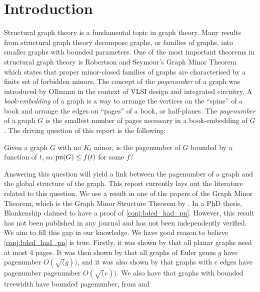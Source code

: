 \chapter{Introduction}\label{sec:introduction}
Structural graph theory is a fundamental topic in graph theory. Many results from structural graph theory decompose graphs, or families of graphs, into smaller graphs with bounded parameters. One of the most important theorems in structural graph theory is Robertson and Seymour's Graph Minor Theorem \cite{robertsonGraphMinorsXX2004} which states that proper minor-closed families of graphs are characterised by a finite set of forbidden minors.
The concept of the \textit{pagenumber} of a graph was introduced by Ollmann \cite{ollmannBookThicknessVarious1973} in the context of VLSI design and integrated circuitry. A \textit{book-embedding} of a graph is a way to arrange the vertices on the ``spine'' of a book and arrange the edges on ``pages'' of a book, or half-planes. The \textit{pagenumber} of a graph \(G\) is the smallest number of pages necessary in a book-embedding of \(G\).
The driving question of this report is the following:
\begin{conjecture}\label{conj:bded_had_pn}
	Given a graph \(G\) with no \(K_t\) minor, is the pagenumber of \(G\) bounded by a function of \(t\), so \(\operatorname{pn}(G) \leq f(t)\) for some \(f\)?
\end{conjecture}
Answering this question will yield a link between the pagenumber of a graph and the global structure of the graph. This report currently lays out the literature related to this question. We use a result in one of the papers of the Graph Minor Theorem, which is the Graph Minor Structure Theorem by \textcite{robertsonGraphMinorsXVI2003}.
In a PhD thesis, Blankenship claimed to have a proof of \cref{conj:bded_had_pn}.\cite{Blankenship-PhD03} However, this result has not been published in any journal and has not been independently verified. We aim to fill this gap in our knowledge.
We have good reason to believe \cref{conj:bded_had_pn} is true. Firstly, it was shown by \textcite{yannakakisEmbeddingPlanarGraphs1989} that all planar graphs need at most 4 pages. It was then shown by \textcite{malitzGenusGraphsHave1994} that all graphs of Euler genus $g$ have pagenumber $O(\sqrt(g))$, and it was also shown by \textcite{malitzGraphsEdgesHave1994} that graphs with $e$ edges have pagenumber pagenumber $O(\sqrt(e))$. We also have that graphs with bounded treewidth have bounded pagenumber, from \textcite{ganleyPagenumberTrees2001} and \textcite{dujmovicGraphTreewidthGeometric2007}
